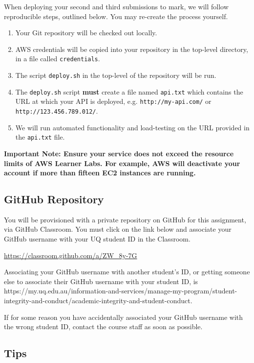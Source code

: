 \documentclass{csse4400}
\begin{document}
\noindent
When deploying your second and third submissions to mark, we will follow reproducible steps, outlined below.
You may re-create the process yourself.

\begin{enumerate}
  \item Your Git repository will be checked out locally.
  \item AWS credentials will be copied into your repository in the top-level directory,
  in a file called \texttt{credentials}.
  \item The script \texttt{deploy.sh} in the top-level of the repository will be run.
  \item The \texttt{deploy.sh} script \textbf{must} create a file named \texttt{api.txt} which contains the URL at which your API is deployed, e.g. \texttt{http://my-api.com/} or \texttt{http://123.456.789.012/}.
  \item We will run automated functionality and load-testing on the URL provided in the \texttt{api.txt} file.
\end{enumerate}

\noindent
\textbf{Important Note: Ensure your service does not exceed the resource limits of AWS Learner Labs. For example, AWS will deactivate your account if more than fifteen EC2 instances are running.}

\subsection{GitHub Repository}\label{sec:github}
You will be provisioned with a private repository on GitHub for this assignment, via GitHub Classroom. You must click on the link below and associate your GitHub username with your UQ student ID in the Classroom.

\url{https://classroom.github.com/a/ZW_8y-7G}

\noindent
Associating your GitHub username with another student's ID, or getting someone else to associate their GitHub username with your student ID, is  {https://my.uq.edu.au/information-and-services/manage-my-program/student-integrity-and-conduct/academic-integrity-and-student-conduct}.

If for some reason you have accidentally associated your GitHub username with the wrong student ID, contact the course staff as soon as possible.

\subsection{Tips}
\end{document}
